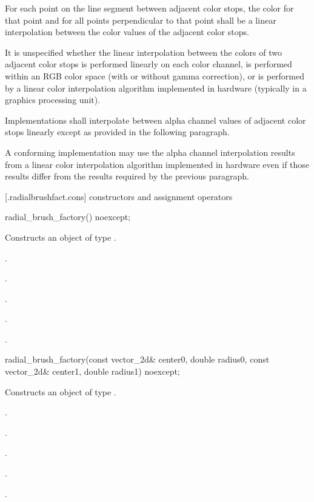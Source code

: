 \pnum
For each point on the line segment between adjacent color stops, the color for that point and for all points perpendicular to that point shall be a linear interpolation between the color values of the adjacent color stops.

\pnum
It is unspecified whether the linear interpolation between the colors of two adjacent color stops is performed linearly on each color channel, is performed within an RGB color space (with or without gamma correction), or is performed by a linear color interpolation algorithm implemented in hardware (typically in a graphics processing unit).

\pnum
Implementations shall interpolate between alpha channel values of adjacent color stops linearly except as provided in the following paragraph.

\pnum
A conforming implementation may use the alpha channel interpolation results from a linear color interpolation algorithm implemented in hardware even if those results differ from the results required by the previous paragraph.

 [\iotwod.radialbrushfact.cons] { constructors and assignment operators}

\begin{itemdecl}
    radial_brush_factory() noexcept;
\end{itemdecl}
\begin{itemdescr}
	\pnum
	\effects
	Constructs an object of type .
	
	\pnum
	\postconditions
	.

	\pnum
	.

	\pnum
	.
	
	\pnum
	.

	\pnum
	.
	
\end{itemdescr}

\begin{itemdecl}
    radial_brush_factory(const vector_2d& center0, double radius0,
      const vector_2d& center1, double radius1) noexcept;
\end{itemdecl}
\begin{itemdescr}
	\pnum
	\effects
	Constructs an object of type .
	
	\pnum
	\postconditions
	.

	\pnum
	.

	\pnum
	.
	
	\pnum
	.

	\pnum
	.
	
\end{itemdescr}

